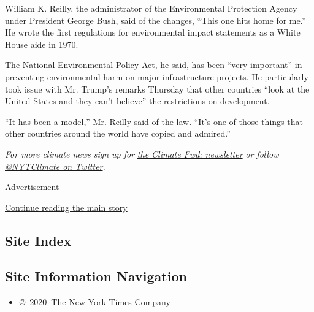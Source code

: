 William K. Reilly, the administrator of the Environmental Protection
Agency under President George Bush, said of the changes, ``This one hits
home for me.'' He wrote the first regulations for environmental impact
statements as a White House aide in 1970.

The National Environmental Policy Act, he said, has been ``very
important'' in preventing environmental harm on major infrastructure
projects. He particularly took issue with Mr. Trump's remarks Thursday
that other countries ``look at the United States and they can't
believe'' the restrictions on development.

``It has been a model,'' Mr. Reilly said of the law. ``It's one of those
things that other countries around the world have copied and admired.''

\emph{For more climate news sign up for}
\href{https://www.nytimes3xbfgragh.onion/newsletters/climate-change}{\emph{the
Climate Fwd: newsletter}} \emph{or follow}
\href{https://twitter.com/nytclimate}{\emph{@NYTClimate on
Twitter}}\emph{.}

Advertisement

\protect\hyperlink{after-bottom}{Continue reading the main story}

\hypertarget{site-index}{%
\subsection{Site Index}\label{site-index}}

\hypertarget{site-information-navigation}{%
\subsection{Site Information
Navigation}\label{site-information-navigation}}

\begin{itemize}
\tightlist
\item
  \href{https://help.nytimes3xbfgragh.onion/hc/en-us/articles/115014792127-Copyright-notice}{©~2020~The
  New York Times Company}
\end{itemize}

